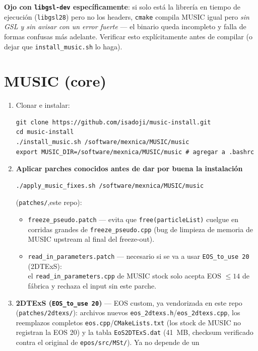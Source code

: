 \documentclass[11pt]{article}
\begin{document}
\textbf{Ojo con \texttt{libgsl-dev} específicamente}: si solo está la
librería en tiempo de ejecución (\texttt{libgsl28}) pero no los headers,
\texttt{cmake} compila MUSIC igual pero \emph{sin GSL y sin avisar con un
error fuerte} — el binario queda incompleto y falla de formas confusas más
adelante. Verificar esto explícitamente antes de compilar (o dejar que
\texttt{install\_music.sh} lo haga).

\section{MUSIC (core)}

\begin{enumerate}[leftmargin=*]
  \item Clonar e instalar:
\begin{Verbatim}[fontsize=\small]
git clone https://github.com/isadoji/music-install.git
cd music-install
./install_music.sh /software/mexnica/MUSIC/music
export MUSIC_DIR=/software/mexnica/MUSIC/music # agregar a .bashrc
\end{Verbatim}
  \item \textbf{Aplicar parches conocidos antes de dar por buena la
  instalación}
  \begin{Verbatim}[fontsize=\small]
  ./apply_music_fixes.sh /software/mexnica/MUSIC/music
\end{Verbatim}
  (\texttt{patches/},este repo):
  \begin{itemize}
    \item \texttt{freeze\_pseudo.patch} --- evita que \texttt{free(particleList)}
      cuelgue en corridas grandes de \texttt{freeze\_pseudo.cpp} (bug de
      limpieza de memoria de MUSIC upstream al final del freeze-out).
    \item \texttt{read\_in\_parameters.patch} --- necesario si se va a usar
      \texttt{EOS\_to\_use 20} (2DTExS): \\el \texttt{read\_in\_parameters.cpp}
      de MUSIC stock solo acepta EOS $\le 14$ de fábrica y rechaza el input
      sin este parche.
  \end{itemize}
  \item \textbf{2DTExS (\texttt{EOS\_to\_use 20})} --- EOS custom, ya
  vendorizada en este repo (\texttt{patches/2dtexs/}): archivos nuevos
  \texttt{eos\_2dtexs.h}/\texttt{eos\_2dtexs.cpp}, los reemplazos completos
  \texttt{eos.cpp}/\texttt{CMakeLists.txt} (los stock de MUSIC no registran
  la EOS 20) y la tabla \texttt{EoS2DTExS.dat} (41~MB, checksum verificado
  contra el original de \texttt{epos/src/MSt/}). Ya no depende de un

\end{enumerate}
\end{document}

